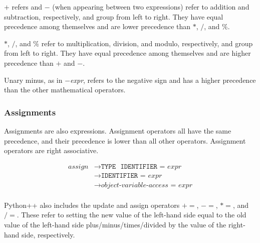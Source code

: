 \documentclass{article}
\begin{document}
\(+\) refers and \(-\) (when appearing between two expressions) refer to addition and subtraction, respectively, and group from left to right. They have equal precedence among themselves and are lower precedence than \(*\), \(/\), and \(\%\).

\(*\), \(/\), and \(\%\) refer to multiplication, division, and modulo, respectively, and group from left to right. They have equal precedence among themselves and are higher precedence than \(+\) and \(-\).

Unary minus, as in \(-\)\textit{expr}, refers to the negative sign and has a higher precedence than the other mathematical operators.

\subsubsection{Assignments}
Assignments are also expressions. Assignment operators all have the same precedence, and their precedence is lower than all other operators. Assignment operators are right associative.

\label{sec:assign}
\begin{align*}
    \textit{assign} &\to \texttt{TYPE} \text{ }  \texttt{IDENTIFIER} \texttt{ = } \hyperref[sec:expr]{\textit{expr}} \\
    &\to \texttt{IDENTIFIER} \texttt{ = } \hyperref[sec:expr]{\textit{expr}} \\
    &\to \hyperref[sec:object-variable-access]{\textit{object-variable-access}} \texttt{ = } \hyperref[sec:expr]{\textit{expr}} \\
\end{align*}

Python++ also includes the update and assign operators \(+=\), \(-=\), \(*=\), and \(/=\). These refer to setting the new value of the left-hand side equal to the old value of the left-hand side plus/minus/times/divided by the value of the right-hand side, respectively.
\end{document}
